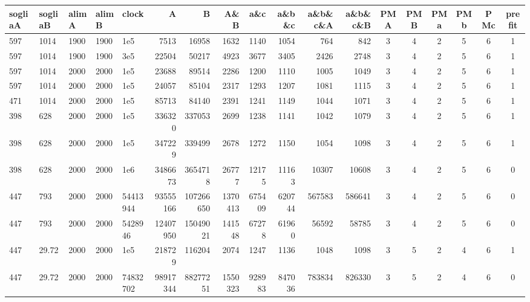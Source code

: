 \begin{landscape}
	\begin{table}[p]
		\centering
		\small
		\begin{tabular}{llll|lrrrrrrr|ccccc|c}
			sogliaA & sogliaB & alimA & alimB & clock & A & B & A\&B & a\&c & a\&b\&c & a\&b\&c\&A & a\&b\&c\&B & PMA & PMB & PMa & PMb & PMc & prefit \\
			\hline\hline
			597 & 1014 & 1900 & 1900 & 1e5 & 7513 & 16958 & 1632 & 1140 & 1054 & 764 & 842 & 3 & 4 & 2 & 5 & 6 & 1                          \\
			597 & 1014 & 1900 & 1900 & 3e5 & 22504 & 50217 & 4923 & 3677 & 3405 & 2426 & 2748 & 3 & 4 & 2 & 5 & 6 & 1                       \\
			597 & 1014 & 2000 & 2000 & 1e5 & 23688 & 89514 & 2286 & 1200 & 1110 & 1005 & 1049 & 3 & 4 & 2 & 5 & 6 & 1                       \\
			597 & 1014 & 2000 & 2000 & 1e5 & 24057 & 85104 & 2317 & 1293 & 1207 & 1081 & 1115 & 3 & 4 & 2 & 5 & 6 & 1                       \\
			471 & 1014 & 2000 & 2000 & 1e5 & 85713 & 84140 & 2391 & 1241 & 1149 & 1044 & 1071 & 3 & 4 & 2 & 5 & 6 & 1                       \\
			398 & 628 & 2000 & 2000 & 1e5 & 336320 & 337053 & 2699 & 1238 & 1141 & 1042 & 1079 & 3 & 4 & 2 & 5 & 6 & 1                      \\
			398 & 628 & 2000 & 2000 & 1e5 & 347229 & 339499 & 2678 & 1272 & 1150 & 1054 & 1098 & 3 & 4 & 2 & 5 & 6 & 1                      \\
			398 & 628 & 2000 & 2000 & 1e6 & 3486673 & 3654718 & 26777 & 12175 & 11163 & 10307 & 10608 & 3 & 4 & 2 & 5 & 6 & 0               \\
			447 & 793 & 2000 & 2000 & 54413944 & 93555166 & 107266650 & 1370413 & 675409 & 620744 & 567583 & 586641 & 3 & 4 & 2 & 5 & 6 & 0 \\
			447 & 793 & 2000 & 2000 & 5428946 & 12407950 & 15049021 & 141548 & 67278 & 61960 & 56592 & 58785 & 3 & 4 & 2 & 5 & 6 & 0        \\
			\hline
			447 & 29.72 & 2000 & 2000 & 1e5 & 218729 & 116204 & 2074 & 1247 & 1136 & 1048 & 1098 & 3 & 5 & 2 & 4 & 6 & 1                       \\
			447 & 29.72 & 2000 & 2000 & 74832702 & 98917344 & 88277251 & 1550323 & 928983 & 847036 & 783834 & 826330 & 3 & 5 & 2 & 4 & 6 & 0   \\

\end{tabular}
\end{table}
\end{landscape}
